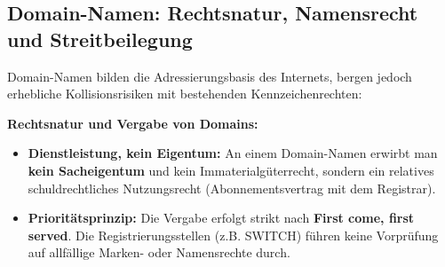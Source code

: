 \subsection{Domain-Namen: Rechtsnatur, Namensrecht und Streitbeilegung}

Domain-Namen bilden die Adressierungsbasis des Internets, bergen jedoch erhebliche Kollisionsrisiken mit bestehenden Kennzeichenrechten:

\begin{theorem}
    \textbf{Rechtsnatur und Vergabe von Domains:}
    \begin{itemize}
        \item \textbf{Dienstleistung, kein Eigentum:} An einem Domain-Namen erwirbt man \textbf{kein Sacheigentum} und kein Immaterialgüterrecht, sondern ein relatives schuldrechtliches Nutzungsrecht (Abonnementsvertrag mit dem Registrar).
        \item \textbf{Prioritätsprinzip:} Die Vergabe erfolgt strikt nach \textbf{First come, first served}. Die Registrierungsstellen (z.B. SWITCH) führen keine Vorprüfung auf allfällige Marken- oder Namensrechte durch.
    \end{itemize}
\end{theorem}

